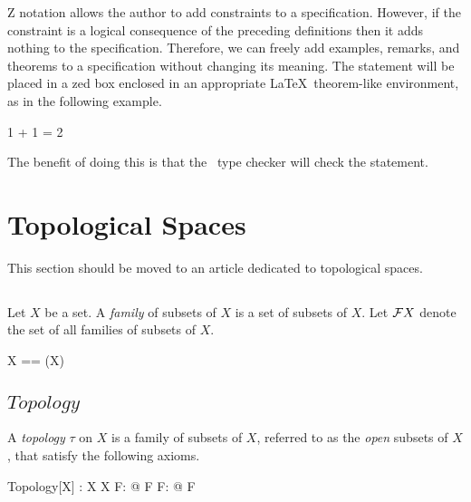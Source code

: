 \documentclass[11pt, oneside]{article}
\begin{document}
Z notation allows the author to add constraints to a specification.
However, if the constraint is a logical consequence of the preceding definitions then it adds nothing to the specification.
Therefore, we can freely add examples, remarks, and theorems to a specification without changing its meaning.
The statement will be placed in a zed box enclosed in an appropriate \LaTeX\ theorem-like environment, as in the following example.

\begin{example}

\begin{zed}
	1 + 1 = 2
\end{zed}
	
\end{example}

The benefit of doing this is that the \fuzz\ type checker will check the statement.

\section{Topological Spaces}

This section should be moved to an article dedicated to topological spaces.

\subsection{}

Let $X$ be a set.
A {\it family} of subsets of $X$ is a set of subsets of $X$.
Let $\mathcal{F} X$ denote the set of all families of subsets of $X$.

\begin{zed}
	\family X == \power(\power X)
\end{zed}

\subsection{$Topology$}

A {\it topology} $\tau$ on $X$ is a family of subsets of $X$, referred to as the {\it open} subsets of $X$, that satisfy the following axioms.

\begin{schema}{Topology}[X]
	\tau: \family X
\where
	\emptyset \in \tau
\also
	X \in \tau
\also
	\forall F: \finset \tau @ \bigcap F \in \tau
\also
	\forall F: \power \tau @ \bigcup F \in \tau
\end{schema}
\end{document}
